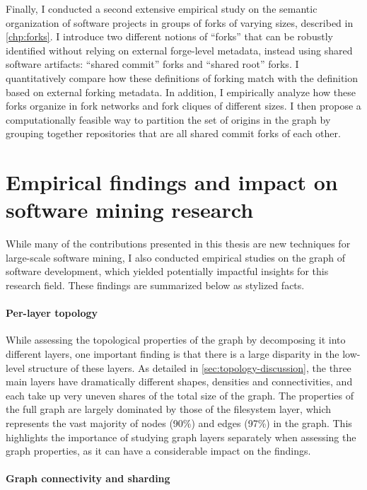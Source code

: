 Finally, I conducted a second extensive empirical study on the semantic
organization of software projects in groups of forks of varying sizes,
described in \cref{chp:forks}. I introduce two different notions of ``forks''
that can be robustly identified without relying on external forge-level
metadata, instead using shared software artifacts: ``shared commit'' forks and
``shared root'' forks. I quantitatively compare how these definitions of
forking match with the definition based on external forking metadata. In
addition, I empirically analyze how these forks organize in fork networks and
fork cliques of different sizes. I then propose a computationally feasible way
to partition the set of origins in the graph by grouping together repositories
that are all shared commit forks of each other.

\section{Empirical findings and impact on software mining research}

While many of the contributions presented in this thesis are new techniques for
large-scale software mining, I also conducted empirical studies on the graph of
software development, which yielded potentially impactful insights for this
research field. These findings are summarized below as stylized facts.

\paragraph*{Per-layer topology}

While assessing the topological properties of the graph by decomposing it into
different layers, one important finding is that there is a large disparity in
the low-level structure of these layers. As detailed in
\cref{sec:topology-discussion}, the three main layers have dramatically
different shapes, densities and connectivities, and each take up very uneven
shares of the total size of the graph. The properties of the full graph are
largely dominated by those of the filesystem layer, which represents the vast
majority of nodes (90\%) and edges (97\%) in the graph.
This highlights the importance of studying graph layers separately when
assessing the graph properties, as it can have a considerable impact on the
findings.

\paragraph*{Graph connectivity and sharding}

